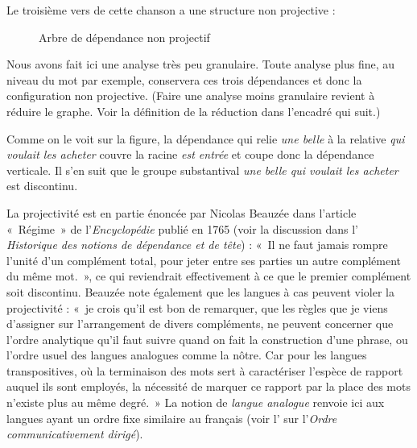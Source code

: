 Le troisième vers de cette chanson a une structure non projective :

\begin{figure}

\caption{\label{fig:}Arbre de dépendance non projectif}

\end{figure}

Nous avons fait ici une analyse très peu granulaire. Toute analyse plus fine, au niveau du mot par exemple, conservera ces trois dépendances et donc la configuration non projective. (Faire une analyse moins granulaire revient à réduire le graphe. Voir la définition de la réduction dans l’encadré qui suit.)

Comme on le voit sur la figure, la dépendance qui relie \textit{une belle} à la relative \textit{qui voulait les acheter} couvre la racine \textit{est entrée} et coupe donc la dépendance verticale. Il s’en suit que le groupe substantival \textit{une belle qui voulait les acheter} est discontinu.

La projectivité est en partie énoncée par Nicolas Beauzée dans l’article «~Régime~» de l’\textit{Encyclopédie} publié en 1765 (voir la discussion dans l’ \textit{Historique des notions de dépendance et de tête}) : «~Il ne faut jamais rompre l’unité d’un complément total, pour jeter entre ses parties un autre complément du même mot.~», ce qui reviendrait effectivement à ce que le premier complément soit discontinu. Beauzée note également que les langues à cas peuvent violer la projectivité : «~je crois qu’il est bon de remarquer, que les règles que je viens d’assigner sur l’arrangement de divers compléments, ne peuvent concerner que l’ordre analytique qu’il faut suivre quand on fait la construction d’une phrase, ou l’ordre usuel des langues analogues comme la nôtre. Car pour les langues transpositives, où la terminaison des mots sert à caractériser l’espèce de rapport auquel ils sont employés, la nécessité de marquer ce rapport par la place des mots n’existe plus au même degré.~» La notion de \textit{langue analogue} renvoie ici aux langues ayant un ordre fixe similaire au français (voir l’ sur l’\textit{Ordre communicativement dirigé}).


